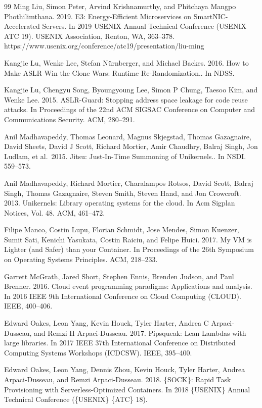 \begin{thebibliography}{99}
 Ming Liu, Simon Peter, Arvind Krishnamurthy, and Phitchaya Mangpo Phothilimthana. 2019. E3: Energy-Efficient Microservices on SmartNIC-Accelerated Servers. In 2019 USENIX Annual Technical Conference (USENIX ATC 19). USENIX Association, Renton, WA, 363--378. https://www.usenix.org/conference/atc19/presentation/liu-ming

 Kangjie Lu, Wenke Lee, Stefan Nürnberger, and Michael Backes. 2016. How to Make ASLR Win the Clone Wars: Runtime Re-Randomization.. In NDSS.

 Kangjie Lu, Chengyu Song, Byoungyoung Lee, Simon P Chung, Taesoo Kim, and Wenke Lee. 2015. ASLR-Guard: Stopping address space leakage for code reuse attacks. In Proceedings of the 22nd ACM SIGSAC Conference on Computer and Communications Security. ACM, 280--291.

 Anil Madhavapeddy, Thomas Leonard, Magnus Skjegstad, Thomas Gazagnaire, David Sheets, David J Scott, Richard Mortier, Amir Chaudhry, Balraj Singh, Jon Ludlam, et al.~2015. Jitsu: Just-In-Time Summoning of Unikernels.. In NSDI. 559--573.

 Anil Madhavapeddy, Richard Mortier, Charalampos Rotsos, David Scott, Balraj Singh, Thomas Gazagnaire, Steven Smith, Steven Hand, and Jon Crowcroft. 2013. Unikernels: Library operating systems for the cloud. In Acm Sigplan Notices, Vol. 48. ACM, 461--472.

 Filipe Manco, Costin Lupu, Florian Schmidt, Jose Mendes, Simon Kuenzer, Sumit Sati, Kenichi Yasukata, Costin Raiciu, and Felipe Huici. 2017. My VM is Lighter (and Safer) than your Container. In Proceedings of the 26th Symposium on Operating Systems Principles. ACM, 218--233.

 Garrett McGrath, Jared Short, Stephen Ennis, Brenden Judson, and Paul Brenner. 2016. Cloud event programming paradigms: Applications and analysis. In 2016 IEEE 9th International Conference on Cloud Computing (CLOUD). IEEE, 400--406.

 Edward Oakes, Leon Yang, Kevin Houck, Tyler Harter, Andrea C Arpaci-Dusseau, and Remzi H Arpaci-Dusseau. 2017. Pipsqueak: Lean Lambdas with large libraries. In 2017 IEEE 37th International Conference on Distributed Computing Systems Workshops (ICDCSW). IEEE, 395--400.

 Edward Oakes, Leon Yang, Dennis Zhou, Kevin Houck, Tyler Harter, Andrea Arpaci-Dusseau, and Remzi Arpaci-Dusseau. 2018. \{SOCK\}: Rapid Task Provisioning with Serverless-Optimized Containers. In 2018 \{USENIX\} Annual Technical Conference (\{USENIX\} \{ATC\} 18).


\end{thebibliography}
